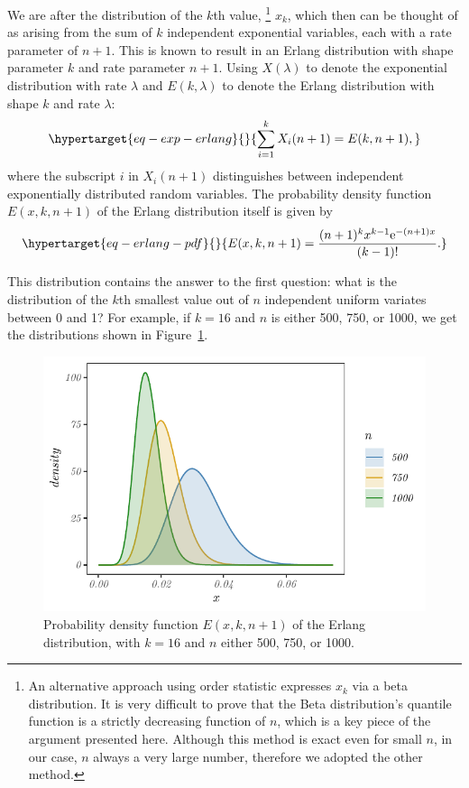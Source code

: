 We are after the distribution of the $k$th value,
%
\footnote{An alternative approach using order statistic  expresses $x_k$ via a beta distribution. It is very difficult to prove  that the Beta distribution's quantile function is a strictly decreasing function of $n$, which is a key piece of the argument presented here. Although this method is exact even for small $n$, in our case, $n$ always a very large number, therefore we adopted the other method.} 
%
$x_k$, which then
can be thought of as arising from the sum of $k$ independent
exponential variables, each with a rate parameter of $n+1$. This is
known to result in an Erlang distribution with shape parameter $k$ and
rate parameter $n+1$. Using $X(\lambda)$ to denote the exponential
distribution with rate $\lambda$ and $E(k,\lambda)$ to denote the
Erlang distribution with shape $k$ and rate $\lambda$:
\begin{equation}\protect\hypertarget{eq-exp-erlang}{}{
\sum_{i=1}^k X_i(n+1)
= E(k,n+1) ,
}\label{eq-exp-erlang}\end{equation} where the subscript $i$ in
$X_i(n+1)$ distinguishes between independent exponentially distributed
random variables. The probability density function $E(x, k,n+1)$ of
the Erlang distribution itself is given by
\begin{equation}\protect\hypertarget{eq-erlang-pdf}{}{
E(x, k, n+1)
= \frac{(n+1)^k x^{k-1} \text{e}^{-(n+1)x}}{(k-1)!} .
}\label{eq-erlang-pdf}\end{equation}

This distribution contains the answer to the first question: what is the
distribution of the $k$th smallest value out of $n$ independent
uniform variates between 0 and 1? For example, if $k=16$ and $n$ is
either 500, 750, or 1000, we get the distributions shown in
Figure~\ref{fig-erlang-example}.

\begin{figure}[!ht]
  \centering
  \includegraphics[width=.7\textwidth]{fig/fig-erlang-example-1.pdf}
  \caption[Probability density function of the Erlang distribution]{Probability density function $E(x, k, n+1)$ of the Erlang distribution, with $k=16$ and $n$ either 500, 750, or 1000.}
  \label{fig-erlang-example}
\end{figure}

